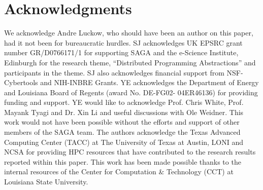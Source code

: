 \documentclass[conference,final]{IEEEtran}
\begin{document}




\section{Acknowledgments}
We acknowledge Andre Luckow, who should have been an author on this
paper, had it not been for bureaucratic hurdles.  SJ acknowledges UK
EPSRC grant number GR/D0766171/1 for supporting SAGA and the e-Science
Institute, Edinburgh for the research theme, ``Distributed Programming
Abstractions'' and participants in the theme. SJ also acknowledges
financial support from NSF-Cybertools and NIH-INBRE Grants. YE
acknowledges the Department of Energy and Louisiana Board of Regents
(award No. DE-FG02- 04ER46136) for providing funding and support. YE
would like to acknowledge Prof. Chris White, Prof. Mayank Tyagi and
Dr. Xin Li and useful discussions with Ole Weidner. This work would
not have been possible without the efforts and support of other
members of the SAGA team. The authors acknowledge the Texas Advanced
Computing Center (TACC) at The University of Texas at Austin, LONI and
NCSA for providing HPC resources that have contributed to the research
results reported within this paper. This work has been made possible
thanks to the internal resources of the Center for Computation \&
Technology (CCT) at Louisiana State University.

 

\end{document}
